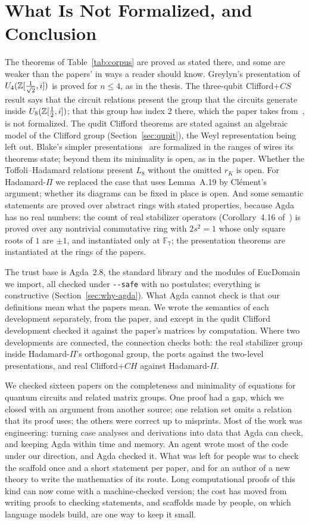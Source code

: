 \section{What Is Not Formalized, and Conclusion}\label{sec:conclusion}

The theorems of Table~\ref{tab:corpus} are proved as stated there, and
some are weaker than the papers' in ways a reader should know.
Greylyn's presentation of $U_4(\mathbb{Z}[\frac1{\sqrt2},i])$ is proved for
$n\le4$, as in the thesis. The three-qubit Clifford+$CS$ result says
that the circuit relations present the group that the circuits
generate inside $U_8(\mathbb{Z}[\frac12,i])$; that this group has index 2
there, which the paper takes from~\cite{amy2020numbertheoretic}, is
not formalized. The qudit Clifford theorems are stated against an
algebraic model of the Clifford group (Section~\ref{sec:qupit}), the
Weyl representation being left out. Blake's simpler
presentations~\cite{blake2026simpler} are formalized in the ranges of
wires its theorems state; beyond them its minimality is open, as in the
paper. Whether the Toffoli--Hadamard relations present $L_8$ without
the omitted $r_K$ is open. For Hadamard-$\Pi$ we
replaced the case that uses Lemma~A.19 by Cl\'ement's argument;
whether its diagrams can be fixed in place is open. And some semantic
statements are proved over abstract rings with stated properties,
because Agda has no real numbers: the count of real stabilizer
operators (Corollary~4.16 of~\cite{makary2021real}) is proved over any
nontrivial commutative ring with $2s^2=1$ whose only square roots of
$1$ are $\pm1$, and instantiated only at $\mathbb{F}_7$; the
presentation theorems are instantiated at the rings of the papers.

The trust base is Agda~2.8, the standard library and the modules of
EucDomain we import, all checked under \texttt{-{}-safe} with no
postulates; everything is constructive (Section~\ref{sec:why-agda}).
What Agda cannot check is that our definitions mean what the papers
mean. We wrote the semantics of each development separately, from the
paper, and except in the qudit Clifford development checked it against
the paper's matrices by computation. Where two developments are
connected, the connection checks both: the real stabilizer group
inside Hadamard-$\Pi$'s orthogonal group, the ports against the
two-level presentations, and real Clifford+$CH$ against
Hadamard-$\Pi$.

We checked sixteen papers on the completeness and minimality of
equations for quantum circuits and related matrix groups. One proof
had a gap, which we closed with an argument from another source; one
relation set omits a relation that its proof uses; the others were
correct up to misprints. Most of the work was engineering:
turning case analyses and derivations into data that Agda can check,
and keeping Agda within time and memory. An agent wrote most of the
code under our direction, and Agda checked it. What was left for people
was to check the scaffold once and a short statement per paper, and
for an author of a new theory to write the mathematics of its route.
Long computational proofs of this kind can now come with a
machine-checked version; the cost has moved from writing proofs to
checking statements, and scaffolds made by people, on which language
models build, are one way to keep it small.
